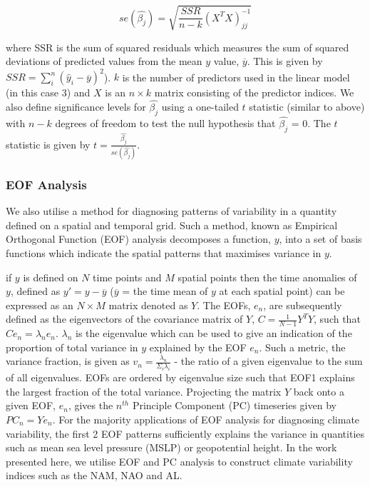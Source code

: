 \begin{equation} \label{regression}
se(\hat{\beta_j}) = \sqrt{\frac{SSR}{n - k} (X^TX)^{-1}_{jj}}
\end{equation}

where SSR is the sum of squared residuals which measures the sum of squared deviations of predicted values from the mean $y$ value, $\overline{y}$. This is given by $SSR = \sum_i^n{(\hat{y}_i - \overline{y})^2}$). $k$ is the number of predictors used in the linear model (in this case 3) and $X$ is an $n \times k$ matrix consisting of the predictor indices. We also define significance levels for $\hat{\beta_j}$ using a one-tailed $t$ statistic (similar to above) with $n-k$ degrees of freedom to test the null hypothesis that $\hat{\beta_j}$ = 0. The $t$ statistic is given by $t = \frac{\hat{\beta_j}}{se(\hat{\beta_j})}$.

\subsubsection{EOF Analysis}
\label{sec:eof_analysis}
We also utilise a method for diagnosing patterns of variability in a quantity defined on a spatial and temporal grid. Such a method, known as Empirical Orthogonal Function (EOF) analysis decomposes a function, $y$, into a set of basis functions which indicate the spatial patterns that maximises variance in $y$. 

if $y$ is defined on $N$ time points and $M$ spatial points then the time anomalies of $y$, defined as $y' = y - \overline{y}$ ($\overline{y}$ = the time mean of $y$ at each spatial point) can be expressed as an $N \times M$ matrix denoted as $Y$. The EOFs, $e_n$, are subsequently defined as the eigenvectors of the covariance matrix of $Y$, $C = \frac{1}{N-1}Y^TY$, such that $C e_n = \lambda_n e_n$. $\lambda_n$ is the eigenvalue which can be used to give an indication of the proportion of total variance in $y$ explained by the EOF $e_n$. Such a metric, the variance fraction, is given as $v_n = \frac{\lambda_n}{\Sigma_i \lambda_i}$ - the ratio of a given eigenvalue to the sum of all eigenvalues. EOFs are ordered by eigenvalue size such that EOF1 explains the largest fraction of the total variance. Projecting the matrix $Y$ back onto a given EOF, $e_n$, gives the $n^{th}$ Principle Component (PC) timeseries given by $PC_n = Y e_n$. For the majority applications of EOF analysis for diagnosing climate variability, the first 2 EOF patterns sufficiently explains the variance in quantities such as mean sea level pressure (MSLP) or geopotential height. In the work presented here, we utilise EOF and PC analysis to construct climate variability indices such as the NAM, NAO and AL.  

